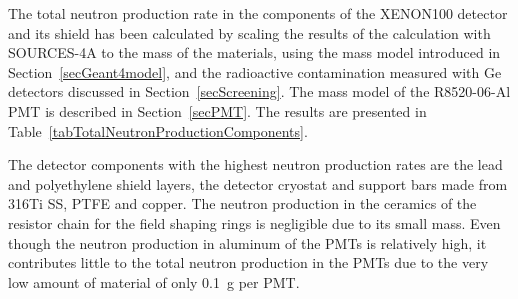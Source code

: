 The total neutron production rate in the components of the XENON100 detector and its shield has been calculated by scaling the results of the calculation with SOURCES-4A to the mass of the materials, using the mass model introduced in Section~\ref{secGeant4model}, and the radioactive contamination measured with Ge detectors discussed in Section~\ref{secScreening}. The mass model of the R8520-06-Al PMT is described in Section~\ref{secPMT}. The results are presented in Table~\ref{tabTotalNeutronProductionComponents}.

The detector components with the highest neutron production rates are the lead and polyethylene shield layers, the detector cryostat and support bars made from 316Ti SS, PTFE and copper. The neutron production in the ceramics of the resistor chain for the field shaping rings is negligible due to its small mass. 
Even though the neutron production in aluminum of the PMTs is relatively high, it contributes little to the total neutron production in the PMTs due to the very low amount of material of only 0.1~g per PMT.

